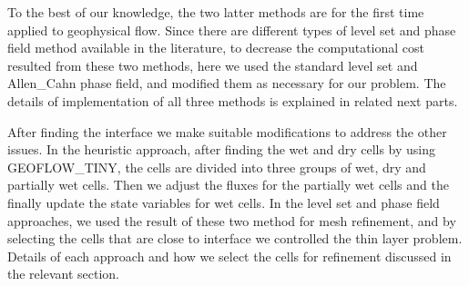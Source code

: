 \documentclass[letterpaper,10pt]{article}
\begin{document}
 To the best of our knowledge, the two latter methods  are for the first time applied to geophysical flow. Since there are different types of level set and phase field method available in the 
 literature, to decrease the computational cost resulted from these two methods, here we used the standard level set and Allen\_Cahn phase field, and modified them as necessary for our problem. 
 The details of implementation of all three methods is explained in related next parts.

After finding the interface we make suitable modifications to address the other issues. In the heuristic approach, after finding the wet and dry cells by using GEOFLOW\_TINY, the cells are divided 
into three groups of wet, dry and partially wet cells. Then we  adjust the fluxes for the partially wet cells and the finally update the state variables for wet cells.
In the level set and phase field approaches, we used the result of these two method for mesh refinement, and by selecting the cells that are close to interface we controlled the thin layer problem. 
Details of each approach and how we select the cells for refinement discussed in the relevant section.
\end{document}
